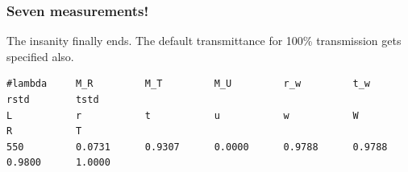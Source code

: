 \documentclass{article}
\begin{document}
\subsubsection{Seven measurements!}
The insanity finally ends.  The default transmittance for
100\% transmission gets specified also.
\begin{center}
\begin{minipage}{12cm}
\scriptsize
\begin{verbatim}
#lambda     M_R         M_T         M_U         r_w         t_w         rstd        tstd
L           r           t           u           w           W           R           T
550         0.0731      0.9307      0.0000      0.9788      0.9788      0.9800      1.0000
\end{verbatim}
\end{minipage}
\end{center}
\end{document}
